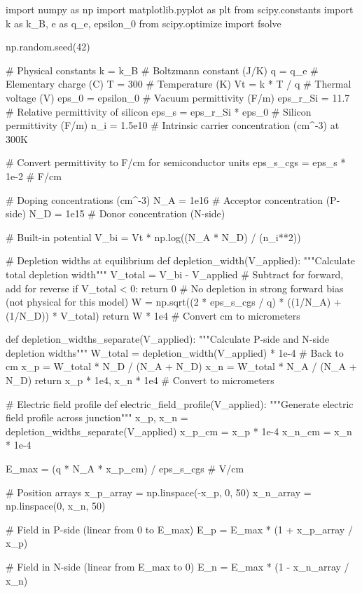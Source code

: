 \documentclass[a4paper, 11pt]{article}
\begin{document}
\begin{pycode}
import numpy as np
import matplotlib.pyplot as plt
from scipy.constants import k as k_B, e as q_e, epsilon_0
from scipy.optimize import fsolve

np.random.seed(42)

# Physical constants
k = k_B  # Boltzmann constant (J/K)
q = q_e  # Elementary charge (C)
T = 300  # Temperature (K)
Vt = k * T / q  # Thermal voltage (V)
eps_0 = epsilon_0  # Vacuum permittivity (F/m)
eps_r_Si = 11.7  # Relative permittivity of silicon
eps_s = eps_r_Si * eps_0  # Silicon permittivity (F/m)
n_i = 1.5e10  # Intrinsic carrier concentration (cm^-3) at 300K

# Convert permittivity to F/cm for semiconductor units
eps_s_cgs = eps_s * 1e-2  # F/cm

# Doping concentrations (cm^-3)
N_A = 1e16  # Acceptor concentration (P-side)
N_D = 1e15  # Donor concentration (N-side)

# Built-in potential
V_bi = Vt * np.log((N_A * N_D) / (n_i**2))

# Depletion widths at equilibrium
def depletion_width(V_applied):
    """Calculate total depletion width"""
    V_total = V_bi - V_applied  # Subtract for forward, add for reverse
    if V_total < 0:
        return 0  # No depletion in strong forward bias (not physical for this model)
    W = np.sqrt((2 * eps_s_cgs / q) * ((1/N_A) + (1/N_D)) * V_total)
    return W * 1e4  # Convert cm to micrometers

def depletion_widths_separate(V_applied):
    """Calculate P-side and N-side depletion widths"""
    W_total = depletion_width(V_applied) * 1e-4  # Back to cm
    x_p = W_total * N_D / (N_A + N_D)
    x_n = W_total * N_A / (N_A + N_D)
    return x_p * 1e4, x_n * 1e4  # Convert to micrometers

# Electric field profile
def electric_field_profile(V_applied):
    """Generate electric field profile across junction"""
    x_p, x_n = depletion_widths_separate(V_applied)
    x_p_cm = x_p * 1e-4
    x_n_cm = x_n * 1e-4

    E_max = (q * N_A * x_p_cm) / eps_s_cgs  # V/cm

    # Position arrays
    x_p_array = np.linspace(-x_p, 0, 50)
    x_n_array = np.linspace(0, x_n, 50)

    # Field in P-side (linear from 0 to E_max)
    E_p = E_max * (1 + x_p_array / x_p)

    # Field in N-side (linear from E_max to 0)
    E_n = E_max * (1 - x_n_array / x_n)


\end{pycode}
\end{document}
